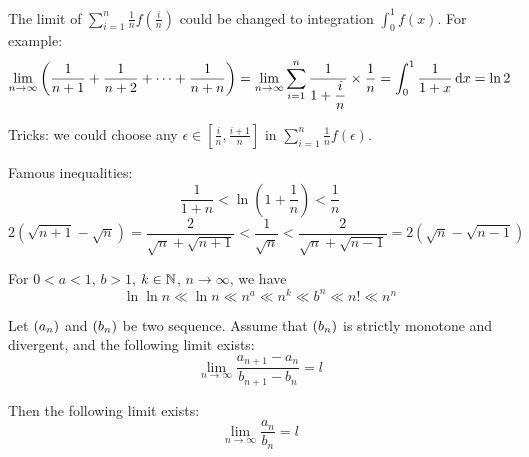 \begin{example}
    The limit of $\displaystyle \sum_{i=1}^n \frac{1}{n}f\left(\frac{i}{n}\right)$ could be changed to integration $\displaystyle \int_{0}^1 f(x)$. For example:
    \begin{equation}
        \lim_{n \rightarrow \infty} \left( \frac{1}{n+1} + \frac{1}{n+2} + \cdots + \frac{1}{n+n} \right) = \lim_{n \rightarrow \infty} \sum_{i=1}^n \frac{1}{\displaystyle 1+\frac{i}{n}} \times \frac{1}{n} = \int_0^1 \frac{1}{1+x} \dif x = \ln 2
    \end{equation}
    
    Tricks: we could choose any $\epsilon \in \left[\frac{i}{n}, \frac{i+1}{n}\right]$ in $\displaystyle \sum_{i=1}^n \frac{1}{n}f(\epsilon)$.
\end{example}


\begin{example}
    Famous inequalities:
    \begin{equation}
        \frac{1}{1+n} < \ln \left(1+\frac{1}{n} \right) < \frac{1}{n}
    \end{equation}
    \begin{equation}
        2(\sqrt{n+1} - \sqrt{n}) = \frac{2}{\sqrt{n} + \sqrt{n+1}} < \frac{1}{\sqrt{n}} < \frac{2}{\sqrt{n} + \sqrt{n-1}} = 2(\sqrt{n} - \sqrt{n-1} )
    \end{equation}
\end{example}

\begin{example}
    For $0 < a < 1$, $b > 1$, $k \in \mathbb{N}$, $n \rightarrow \infty$, we have
    \begin{equation}
        \ln \ln n \ll \ln n \ll n^a \ll n^k \ll b^n \ll n! \ll n^n
    \end{equation}
\end{example}


\begin{theorem}
    Let $\sequence{a_n}$ and $\sequence{b_n}$ be two sequence. Assume that $\sequence{b_n}$ is strictly monotone and divergent, and the following limit exists:
    \begin{equation}
        \lim_{n \rightarrow \infty} \frac{a_{n+1} - a_n}{b_{n+1} - b_n} = l
    \end{equation}
    
    Then the following limit exists:
    \begin{equation}
        \lim_{n \rightarrow \infty} \frac{a_n}{b_n} = l
    \end{equation}
\end{theorem}



